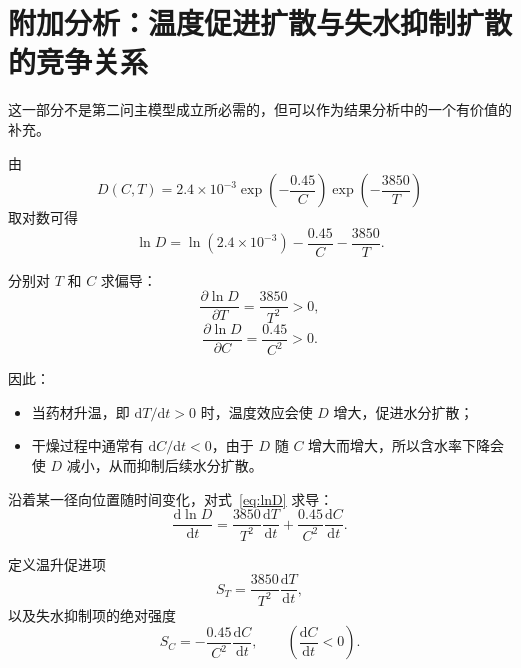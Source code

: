 \documentclass[UTF8,a4paper,12pt]{ctexart}
\begin{document}
\section{附加分析：温度促进扩散与失水抑制扩散的竞争关系}

这一部分不是第二问主模型成立所必需的，但可以作为结果分析中的一个有价值的补充。

由
\begin{equation}
    D(C,T)
    =
    2.4\times10^{-3}
    \exp\!\left(-\frac{0.45}{C}\right)
    \exp\!\left(-\frac{3850}{T}\right)
\end{equation}
取对数可得
\begin{equation}
    \ln D
    =
    \ln(2.4\times10^{-3})
    -\frac{0.45}{C}
    -\frac{3850}{T}.
    \label{eq:lnD}
\end{equation}

分别对 $T$ 和 $C$ 求偏导：
\begin{equation}
    \frac{\partial \ln D}{\partial T}
    =
    \frac{3850}{T^2}>0,
    \label{eq:sensitivityT}
\end{equation}
\begin{equation}
    \frac{\partial \ln D}{\partial C}
    =
    \frac{0.45}{C^2}>0.
    \label{eq:sensitivityC}
\end{equation}

因此：
\begin{itemize}
    \item 当药材升温，即 $\mathrm{d}T/\mathrm{d}t>0$ 时，温度效应会使 $D$ 增大，促进水分扩散；
    \item 干燥过程中通常有 $\mathrm{d}C/\mathrm{d}t<0$，由于 $D$ 随 $C$ 增大而增大，所以含水率下降会使 $D$ 减小，从而抑制后续水分扩散。
\end{itemize}

沿着某一径向位置随时间变化，对式~\eqref{eq:lnD} 求导：
\begin{equation}
    \frac{\mathrm{d}\ln D}{\mathrm{d}t}
    =
    \frac{3850}{T^2}\frac{\mathrm{d}T}{\mathrm{d}t}
    +
    \frac{0.45}{C^2}\frac{\mathrm{d}C}{\mathrm{d}t}.
    \label{eq:dlnDdt}
\end{equation}

定义温升促进项
\begin{equation}
    S_T
    =
    \frac{3850}{T^2}\frac{\mathrm{d}T}{\mathrm{d}t},
\end{equation}
以及失水抑制项的绝对强度
\begin{equation}
    S_C
    =
    -\frac{0.45}{C^2}\frac{\mathrm{d}C}{\mathrm{d}t},
    \qquad
    \left(
    \frac{\mathrm{d}C}{\mathrm{d}t}<0
    \right).
\end{equation}
\end{document}
